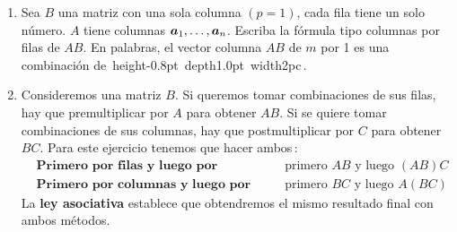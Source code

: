 \documentclass[12pt,a4paper]{article}
\newcommand{\bi}[1]{\hbox{\boldmath$#1$}}
\newcommand\1{\mbox{\,\vrule height-0.8pt depth1.0pt width2pc\,}}
\newcommand\2{\mbox{\,\vrule height-0.8pt depth1.0pt width1pc\,}}
\begin{document}
\begin{enumerate}
\begin{enumerate}
\end{enumerate}

\item  Sea $B$ una matriz con una sola columna $(p = 1)$, cada fila tiene un solo número. $A$ tiene columnas $\bi{a}_{1},\dots,\bi{a}_{n}$. Escriba la fórmula tipo columnas por filas de $AB$. En palabras, el vector columna $AB$ de $m$ por 1 es una combinación de \1.


\item Consideremos una matriz $B$. Si queremos tomar combinaciones de sus filas, hay que premultiplicar por $A$ para obtener $AB$. Si se quiere tomar combinaciones de sus columnas, hay que postmultiplicar por $C$ para obtener $BC$. Para este ejercicio tenemos que hacer ambos\,:
%
%
\begin{align*}
&\textbf{Primero por filas y luego por columnas}
& &\text{primero $AB$ y luego $(AB)C$}
\\
&\textbf{Primero por columnas y luego por filas}
& &\text{primero $BC$ y luego $A(BC)$}
\end{align*}
La \textbf{ley asociativa} establece que obtendremos el mismo resultado final con ambos métodos.


\end{enumerate}
\end{document}
